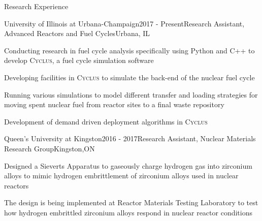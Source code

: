\documentclass{resume2} %
\begin{document}
\begin{rSection}{Research Experience}

\begin{rSubsection}{University of Illinois at Urbana-Champaign}{2017 - Present}{Research Assistant, Advanced Reactors and Fuel Cycles}{Urbana, IL}
\item Conducting research in fuel cycle analysis specifically using Python and C++ to develop \textsc{Cyclus}, a fuel cycle simulation software
\item Developing facilities in \textsc{Cyclus} to simulate the back-end of the nuclear fuel cycle 
\item Running various simulations to model different transfer and loading strategies for moving spent nuclear fuel from reactor sites to a final waste repository
\item Development of demand driven deployment algorithms in \textsc{Cyclus} 
\end{rSubsection}

\begin{rSubsection}{Queen's University at Kingston}{2016 - 2017}{Research Assistant, Nuclear Materials Research Group}{Kingston,ON}
\item Designed a Sieverts Apparatus to gaseously charge hydrogen gas into zirconium alloys to mimic hydrogen embrittlement of zirconium alloys used in nuclear reactors
\item The design is being implemented at Reactor Materials Testing Laboratory to test how hydrogen embrittled zirconium alloys respond in nuclear reactor conditions
\iffalse
\item Application to nuclear industry: zirconium alloys used in nuclear reactors succumb to hydrogen embrittlement during its lifetime, therefore, it is important to be able to replicate the conditions in nuclear reactors, so as to study its end-of-life conditions
\fi
\end{rSubsection}


\end{rSection}
\end{document}
